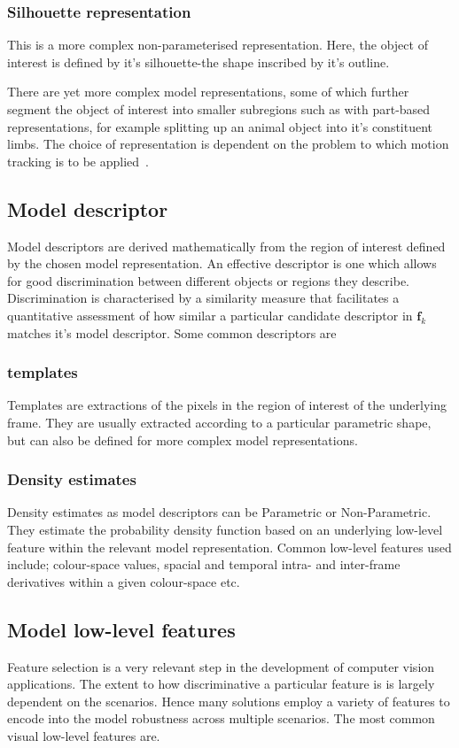 \subsubsection{Silhouette representation}
This is a more complex non-parameterised representation. Here, the object of
interest is defined by it's silhouette-the shape inscribed by it's outline.

There are yet more complex model representations, some of which further segment
the object of interest into smaller subregions such as with part-based
representations, for example splitting up an animal object into it's constituent
limbs. The choice of representation is dependent on the problem to which motion
tracking is to be applied~\cite{Porikli2012}.

\subsection{Model descriptor}
Model descriptors are derived mathematically from the region of interest defined
by the chosen model representation. An effective descriptor is one which allows
for good discrimination between different objects or regions they
describe. Discrimination is characterised by a similarity measure that
facilitates a quantitative assessment of how similar a particular candidate
descriptor in $\mathbf{f}_{k}$ matches it's model descriptor.
Some common descriptors are

\subsubsection{templates}
Templates are extractions of the pixels in the region of interest of the
underlying frame. They are usually extracted according to a particular
parametric shape, but can also be defined for more complex model representations.

\subsubsection{Density estimates}
Density estimates as model descriptors can be Parametric or Non-Parametric. They
estimate the probability density function based on an underlying low-level
feature within the relevant model representation.
Common low-level features used include; colour-space values, spacial and
temporal intra- and inter-frame derivatives within a given colour-space etc.

\subsection{Model low-level features}
Feature selection is a very relevant step in the development of computer vision
applications. The extent to how discriminative a particular feature is is
largely dependent on the scenarios. Hence many solutions employ a
variety of features to encode into the model robustness across multiple
scenarios. The most common visual low-level features are.

